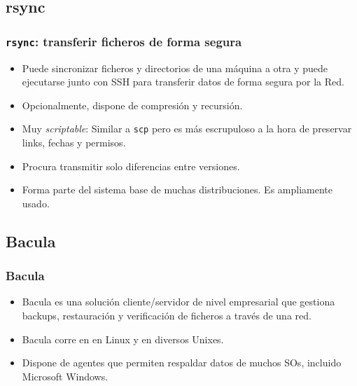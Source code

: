 \documentclass{beamer}
\begin{document}
\subsection{rsync}
\begin{frame}
  \frametitle{\texttt{rsync}: transferir ficheros de forma segura}
  \begin{itemize}
    \item Puede sincronizar ficheros y directorios de una máquina a otra y puede ejecutarse junto con SSH para transferir datos de forma segura por la Red.
    \item Opcionalmente, dispone de compresión y recursión.
    \item Muy \textit{scriptable}: Similar a \texttt{scp} pero es más escrupuloso a la hora de preservar links, fechas y permisos.
    \item Procura transmitir solo diferencias entre versiones.
    \item Forma parte del sistema base de muchas distribuciones. Es ampliamente usado.
  \end{itemize}
\end{frame}


\subsection{Bacula}

\begin{frame}
  \frametitle{Bacula}
  \begin{itemize}
    \item Bacula es una solución cliente/servidor de nivel empresarial que gestiona backups, restauración y verificación de ficheros a través de una red.
    \item Bacula corre en en Linux y en diversos Unixes.
    \item Dispone de agentes que permiten respaldar datos de muchos SOs, incluido Microsoft Windows.
  \end{itemize}
\end{frame}
\end{document}
